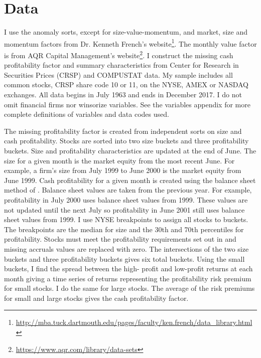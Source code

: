 
\section*{Data}

I use the anomaly sorts, except for size-value-momentum, and market, size and
momentum factors from Dr. Kenneth French's website\footnote{
\url{http://mba.tuck.dartmouth.edu/pages/faculty/ken.french/data_library.html}
}. The monthly value factor is from AQR Capital Management's website\footnote{
\url{https://www.aqr.com/library/data-sets}
}.
I construct the missing cash profitability factor and summary characteristics
from Center for Research in Securities Prices (CRSP) and COMPUSTAT data. My
sample includes all common stocks, CRSP share code 10 or 11, on the NYSE, AMEX
or NASDAQ exchanges. All data begins in July 1963 and ends in December 2017. I
do not omit financial firms nor winsorize variables. See the variables appendix
for more complete definitions of variables and data codes used.

The missing profitability factor is created from independent sorts on size and
cash profitability. Stocks are sorted into two size buckets and three
profitability buckets. Size and profitability characteristics are updated at
the end of June. The size for a given month is the market equity from the most
recent June. For example, a firm’s size from July 1999 to June 2000 is the
market equity from June 1999. Cash profitability for a given month is created
using the balance sheet method of \textcite{ball2016accruals}. Balance sheet
values are taken from the previous year. For example, profitability in July
2000 uses balance sheet values from 1999. These values are not updated until
the next July so profitability in June 2001 still uses balance sheet values
from 1999. I use NYSE breakpoints to assign all stocks to buckets. The
breakpoints are the median for size and the 30th and 70th percentiles for
profitability. Stocks must meet the profitability requirements set out in
\textcite{fama2015five} and missing accruals values are replaced with zero. The
intersections of the two size buckets and three profitability buckets gives six
total buckets. Using the small buckets, I find the spread between the high-
profit and low-profit returns at each month giving a time series of returns
representing the profitability risk premium for small stocks. I do the same for
large stocks. The average of the risk premiums for small and large stocks gives
the cash profitability factor.

